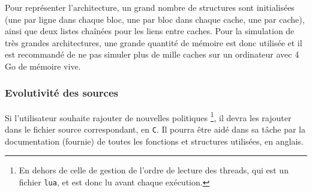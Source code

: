Pour représenter l'architecture, un grand nombre de structures sont initialisées (une par ligne dans chaque bloc, une par bloc dans chaque cache, une par cache), ainsi que deux listes chaînées pour les liens entre caches. Pour la simulation de très grandes architectures, une grande quantité de mémoire est donc utilisée et il est recommandé de ne pas simuler plus de mille caches sur un ordinateur avec 4 Go de mémoire vive.

\subsubsection{Evolutivité des sources}

Si l'utilisateur souhaite rajouter de nouvelles politiques \footnote{En dehors de celle de gestion de l'ordre de lecture des threads, qui est un fichier \texttt{lua}, et est donc lu avant chaque exécution.}, il devra les rajouter dans le fichier source correspondant, en \texttt{C}. Il pourra être aidé dans sa tâche par la documentation (fournie) de toutes les fonctions et structures utilisées, en anglais.
